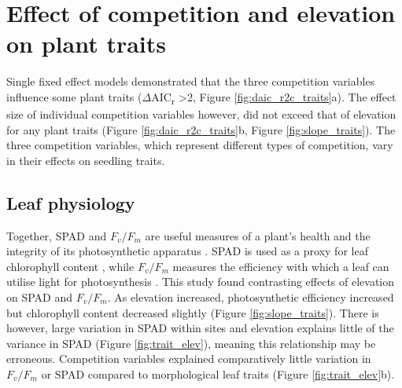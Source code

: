 \documentclass[a4paper, 11pt]{article}
\begin{document}
\section{Effect of competition and elevation on plant traits}
Single fixed effect models demonstrated that the three competition variables influence some plant traits ($\Delta$AIC\textsubscript{r} >2, Figure \ref{fig:daic_r2c_traits}a). The effect size of individual competition variables however, did not exceed that of elevation for any plant traits (Figure \ref{fig:daic_r2c_traits}b, Figure \ref{fig:slope_traits}).  The three competition variables, which represent different types of competition, vary in their effects on seedling traits.
\subsection*{Leaf physiology}
Together, SPAD and $F_v/F_m$ are useful measures of a plant's health and the integrity of its photosynthetic apparatus \citep{Clark2000}. SPAD is used as a proxy for leaf chlorophyll content \citep{Richardson2002}, while $F_v/F_m$ measures the efficiency with which a leaf can utilise light for photosynthesis \citep{Maxwell2000}. This study found contrasting effects of elevation on SPAD and $F_v/F_m$. As elevation increased, photosynthetic efficiency increased but chlorophyll content decreased slightly (Figure \ref{fig:slope_traits}). There is however, large variation in SPAD within sites and elevation explains little of the variance in SPAD (Figure \ref{fig:trait_elev}), meaning this relationship may be erroneous. Competition variables explained comparatively little variation in $F_v/F_m$ or SPAD compared to morphological leaf traits (Figure \ref{fig:trait_elev}b).
\end{document}
